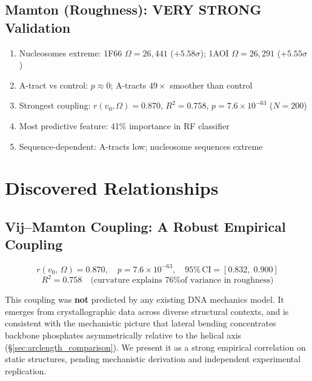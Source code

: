 \subsection{Mamton (Roughness): VERY STRONG Validation}

\begin{enumerate}
    \item[\checkmark] Nucleosomes extreme: 1F66 $\Omega = 26{,}441$ ($+5.58\sigma$); 1AOI $\Omega = 26{,}291$ ($+5.55\sigma$)
    \item[\checkmark] A-tract vs control: $p \approx 0$; A-tracts $49\times$ smoother than control
    \item[\checkmark] Strongest coupling: $r(v_0, \Omega) = 0.870$, $R^2 = 0.758$, $p = 7.6 \times 10^{-63}$ ($N=200$)
    \item[\checkmark] Most predictive feature: 41\% importance in RF classifier
    \item[\checkmark] Sequence-dependent: A-tracts low; nucleosome sequences extreme
\end{enumerate}

\section{Discovered Relationships}

\subsection{Vij--Mamton Coupling: A Robust Empirical Coupling}

\begin{keyresult}
\begin{equation}
    r(v_0,\,\Omega) = 0.870, \quad p = 7.6 \times 10^{-63}, \quad 95\%\,\text{CI} = [0.832,\;0.900]
\end{equation}
\begin{equation}
    R^2 = 0.758 \quad \text{(curvature explains 76\% of variance in roughness)}
\end{equation}
\end{keyresult}

This coupling was \textbf{not} predicted by any existing DNA mechanics model. It emerges from crystallographic data across diverse structural contexts, and is consistent with the mechanistic picture that lateral bending concentrates backbone phosphates asymmetrically relative to the helical axis (\S\ref{sec:arclength_comparison}). We present it as a strong empirical correlation on static structures, pending mechanistic derivation and independent experimental replication.

